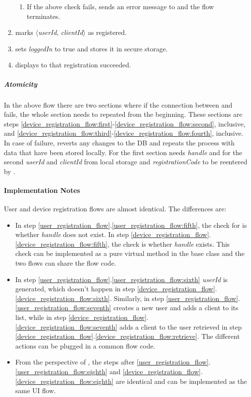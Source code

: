\documentclass[a4paper,10pt]{article}
\newcommand{\handle}{\emph{handle}}
\newcommand{\registrationCode}{\emph{registrationCode}}
\newcommand{\userId}{\emph{userId}}
\newcommand{\clientId}{\emph{clientId}}
\newcommand{\loggedIn}{\emph{loggedIn}}
\begin{document}
\begin{enumerate}
 \begin{enumerate}
  \item If the above check fails, \Server{} sends an error message to \Client{} and the flow terminates.
 \end{enumerate}
 \item\label{device_registration_flow:fourth} \Server{} marks $\langle$\userId{}, \clientId{}$\rangle$ as registered.
 \item \Client{} sets \loggedIn{} to true and stores it in secure storage.
 \item \Client{} displays to \User{} that registration succeeded.
\end{enumerate}

\subparagraph{Atomicity}
In the above flow there are two sections where if the connection between \Server{} and \Client{} fails, the whole section needs to repeated from the beginning. These sections are 
steps \ref{device_registration_flow:first}-\ref{device_registration_flow:second}, inclusive, and \ref{device_registration_flow:third}-\ref{device_registration_flow:fourth}, 
inclusive. In case of failure, \Server{} reverts any changes to the DB and \Client{} repeats the process with data that have been stored locally. For the first section \Client{} 
needs \handle{} and for the second \userId{} and \clientId{} from local storage and \registrationCode{} to be reentered by \User{}.

\paragraph{Implementation Notes}
User and device registration flows are almost identical. The differences are:

\begin{itemize}
 \item In step \ref{user_registration_flow}.\ref{user_registration_flow:fifth}, the check for is whether \handle{} does not exist. In step 
\ref{device_registration_flow}.\ref{device_registration_flow:fifth}, the check is whether \handle{} exists. This check can be implemented as a pure virtual method in the base 
class and the two flows can share the flow code.
 \item In step \ref{user_registration_flow}.\ref{user_registration_flow:sixth} \userId{} is generated, which doesn't happen in step 
\ref{device_registration_flow}.\ref{device_registration_flow:sixth}. Similarly, in step \ref{user_registration_flow}.\ref{user_registration_flow:seventh} \Server{}
creates a new user and adds a client to its list, while in step \ref{device_registration_flow}.\ref{device_registration_flow:seventh} \Server{} adds a client to the user retrieved 
in step \ref{device_registration_flow}.\ref{device_registration_flow:retrieve}. The different actions can be plugged in a common flow code.
 \item From the perspective of \Client{}, the steps after \ref{user_registration_flow}.\ref{user_registration_flow:eighth} and 
\ref{device_registration_flow}.\ref{device_registration_flow:eighth} are identical and can be implemented as the same UI flow.
\end{itemize}
\end{document}
